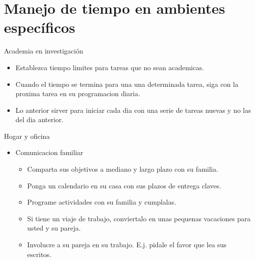 \documentclass[
10pt,
aspectratio=169,
]{beamer}
\begin{document}
\section{Manejo de tiempo en ambientes espec\'ificos}
\begin{frame}[c]{Academia en investigaci\'on}
\begin{itemize}
\item Establezca tiempo limites para tareas que no sean academicas.
\item Cuando el tiempo se termina para una una determinada tarea, siga con la proxima tarea en su programacion diaria. 
\item Lo anterior sirver para iniciar cada dia con una serie de tareas nuevas y no las del dia anterior.
\end{itemize}
\end{frame}

\begin{frame}[c]{Hogar y oficina}
\begin{itemize}
\item \alert{Comunicacion familiar}

\begin{itemize}
\item Comparta sus objetivos a mediano y largo plazo con su familia.
\item Ponga un calendario en su casa con sus plazos de entrega claves. 
\item Programe actividades con su familia y cumplalas.
\item Si tiene un viaje de trabajo, conviertalo en unas pequenas vacaciones para usted y su pareja.
\item Involucre a su pareja en su trabajo. E.j. pidale el favor que lea sus escritos. 
\end{itemize}
\end{itemize}
\end{frame}
\end{document}
